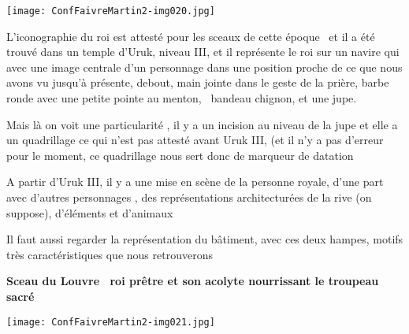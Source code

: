 \documentclass[a4paper]{article}
\begin{document}
\bigskip

 \texttt{[image: ConfFaivreMartin2-img020.jpg]} 


\bigskip


\bigskip


\bigskip


\bigskip


\bigskip


\bigskip


\bigskip

{
L'iconographie du roi est attesté pour les sceaux de cette époque \ et il a été trouvé dans un temple d'Uruk, niveau
III, et il représente le roi sur un navire qui avec une image centrale d'un personnage dans une position proche de ce
que nous avons vu jusqu'à présente, debout, main jointe dans le geste de la prière, barbe ronde avec une petite pointe
au menton, \ bandeau chignon, et une jupe.}

{
Mais là on voit une particularité , il y a un incision au niveau de la jupe et elle a un quadrillage ce qui n'est pas
attesté avant Uruk III, (et il n'y a pas d'erreur pour le moment, ce quadrillage nous sert donc de marqueur de
datation}


\bigskip


\bigskip

{
A partir d'Uruk III, il y a une mise en scène de la personne royale, d'une part avec d'autres personnages , des
représentations architecturées de la rive (on suppose), d'éléments et d'animaux}


\bigskip


\bigskip

{
Il faut aussi regarder la représentation du bâtiment, avec ces deux hampes, motifs très caractéristiques que nous
retrouverons}


\bigskip


\bigskip


\bigskip


\bigskip

{
\textbf{Sceau du Louvre \ roi prêtre et son acolyte nourrissant le troupeau sacré}}


\bigskip


\bigskip

 \texttt{[image: ConfFaivreMartin2-img021.jpg]} 


\bigskip


\bigskip
\end{document}
